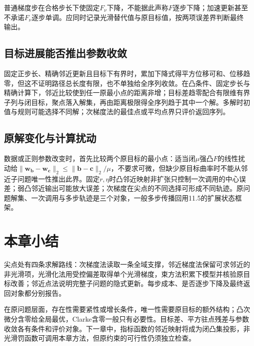 普通梯度步在合格步长下使固定$F_\nu$下降，不能据此声称$F$逐步下降；加速更新甚至不承诺$F_\nu$逐步单调。应同时记录光滑替代值与原目标值，按两项误差界判断最终输出。

\subsection{目标进展能否推出参数收敛}

固定正步长、精确邻近更新且目标下有界时，累加下降式得平方位移可和、位移趋零，但这不证明路径总长度有限，也不单独给全序列收敛。在凸条件、固定步长与精确计算下，邻近比较使到任一原最小点的距离非增；目标差趋零配合有限维有界子列与闭目标，聚点落入解集，再由距离极限得全序列趋于其中一个解。多解时初值与规则可能选择不同解；次梯度法的最佳点或平均点界只评价返回序列。

\subsection{原解变化与计算扰动}

数据或正则参数改变时，首先比较两个原目标的最小点：适当闭$\mu$强凸$F$的线性扰动给$\|\bm w_{\bm b}-\bm w_{\bm c}\|_2\leq\|\bm b-\bm c\|_2/\mu$，不要求可微，但缺少原目标曲率时不能从邻近子问题唯一性推出此界。固定$r,\eta$时凸邻近映射非扩张只控制一次调用的中心误差；弱凸邻近输出可能放大误差；次梯度在尖点的不同选择可形成不同轨迹。原问题解集、一次调用与多步轨迹是三个对象，一般多步传播回用11.5的扩展状态框架。

\section{本章小结}

尖点处有四条求解路线：次梯度法读取一条全域支撑，邻近梯度法保留可求邻近的非光滑项，光滑化法用受控偏差取得单个光滑梯度，束方法积累下模型并核验原目标改善；邻近点法说明完整子问题的隐式更新。每步成本、是否逐步下降及最终返回对象都分别报告。

在原问题层面，存在性需要紧性或增长条件，唯一性需要原目标的额外结构；凸次微分含零给全局最优，Clarke含零一般只有必要性。目标差、平方驻点残差与参数收敛各有条件和评价对象。下一章中，指标函数的邻近映射将成为闭凸集投影，非光滑罚函数可调用本章方法，但原约束的可行性仍须独立检查。
